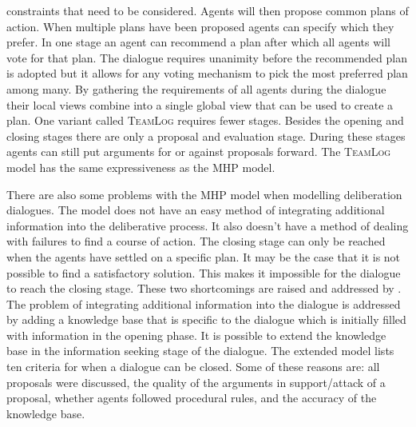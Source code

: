 constraints that need to be considered. Agents will then propose common plans
of action. When multiple plans have been proposed agents can specify which they
prefer. In one stage an agent can recommend a plan after which all agents
will vote for that plan. The dialogue requires unanimity before the recommended
plan is adopted but it allows for any voting mechanism to pick the most
preferred plan among many. By gathering the requirements of all agents during
the dialogue their local views combine into a single global view that can be
used to create a plan. One variant called \textsc{TeamLog}
\cite{dunin-keplicz2011} requires fewer stages. Besides the opening and closing
stages there are only a proposal and evaluation stage. During these stages
agents can still put arguments for or against proposals forward. The
\textsc{TeamLog} model has the same expressiveness as the MHP model.

There are also some problems with the MHP model when modelling
deliberation dialogues. The model does not have an easy method of integrating
additional information into the deliberative process. It also doesn't have a
method of dealing with failures to find a course of action. The closing stage
can only be reached when the agents have settled on a specific plan. It may be
the case that it is not possible to find a satisfactory solution. This makes it
impossible for the dialogue to reach the closing stage. These two shortcomings
are raised and addressed by \cite{walton2014}. The problem of integrating
additional information into the dialogue is addressed by adding a knowledge
base that is specific to the dialogue which is initially filled with
information in the opening phase. It is possible to extend the knowledge base
in the information seeking stage of the dialogue. The extended model lists ten
criteria for when a dialogue can be closed. Some of these reasons are: all
proposals were discussed, the quality of the arguments in support/attack of a
proposal, whether agents followed procedural rules, and the accuracy of the
knowledge base.

